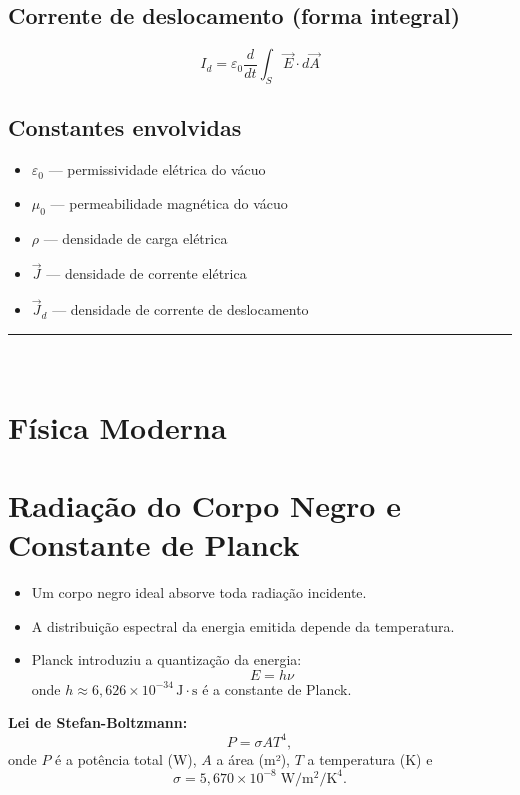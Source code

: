 \documentclass[a4paper,12pt]{article}
\begin{document}
\begin{multicols}{2}
\subsection{Corrente de deslocamento (forma integral)}
\[
I_d = \varepsilon_0 \frac{d}{dt} \int_S \vec{E} \cdot d\vec{A}
\]

\subsection*{Constantes envolvidas}

\begin{itemize}
  \item $\varepsilon_0$ — permissividade elétrica do vácuo
  \item $\mu_0$ — permeabilidade magnética do vácuo
  \item $\rho$ — densidade de carga elétrica
  \item $\vec{J}$ — densidade de corrente elétrica
  \item $\vec{J}_d$ — densidade de corrente de deslocamento
\end{itemize}

\noindent\rule{\linewidth}{1pt}\\

\section{Física Moderna}

\section{Radiação do Corpo Negro e Constante de Planck}
\begin{itemize}
    \item Um corpo negro ideal absorve toda radiação incidente.
    \item A distribuição espectral da energia emitida depende da temperatura.
    \item Planck introduziu a quantização da energia:
    \[
        E = h\nu
    \]
    onde $h \approx 6{,}626 \times 10^{-34} \, \text{J} \cdot \text{s}$ é a constante de Planck.
\end{itemize}

\textbf{Lei de Stefan-Boltzmann:}
\[
P = \sigma A T^4,
\]
onde \( P \) é a potência total (W), \( A \) a área (m²), \( T \) a temperatura (K) e
\[
\sigma = 5{,}670 \times 10^{-8} \; \si{\watt\per\meter\squared\per\kelvin\tothe{4}}.
\]


\end{multicols}
\end{document}
